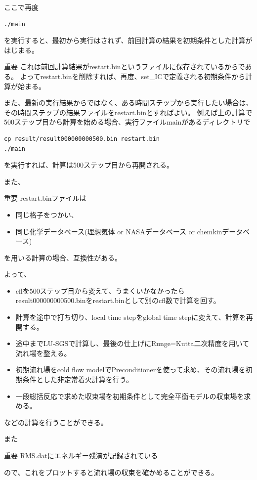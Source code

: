 \documentclass{jsarticle}
\begin{document}
\hspace{1em}

ここで再度
\begin{verbatim}
./main
\end{verbatim}
を実行すると、最初から実行はされず、前回計算の結果を初期条件とした計算がはじまる。
\begin{itembox}[l]{重要}
これは前回計算結果がrestart.binというファイルに保存されているからである。
よってrestart.binを削除すれば、再度、set\_ICで定義される初期条件から計算が始まる。
\end{itembox}
また、最新の実行結果からではなく、ある時間ステップから実行したい場合は、その時間ステップの結果ファイルをrestart.binとすればよい。
例えば上の計算で500ステップ目から計算を始める場合、実行ファイルmainがあるディレクトリで
\begin{verbatim}
cp result/result000000000500.bin restart.bin
./main
\end{verbatim}
を実行すれば、計算は500ステップ目から再開される。

また、
\begin{itembox}[l]{重要}
restart.binファイルは
\begin{itemize}
\item 同じ格子をつかい、
\item 同じ化学データベース(理想気体 or NASAデータベース or chemkinデータベース)
\end{itemize}
を用いる計算の場合、互換性がある。
\end{itembox}
よって、
\begin{itemize}
\item cflを500ステップ目から変えて、うまくいかなかったらresult000000000500.binをrestart.binとして別のcfl数で計算を回す。
\item 計算を途中で打ち切り、local time stepをglobal time stepに変えて、計算を再開する。
\item 途中までLU-SGSで計算し、最後の仕上げにRunge=Kutta二次精度を用いて流れ場を整える。
\item 初期流れ場をcold flow modelでPreconditionerを使って求め、その流れ場を初期条件とした非定常着火計算を行う。
\item 一段総括反応で求めた収束場を初期条件として完全平衡モデルの収束場を求める。
\end{itemize}
などの計算を行うことができる。

\hspace{1em}

また
\begin{itembox}[l]{重要}
RMS.datにエネルギー残渣が記録されている
\end{itembox}
ので、これをプロットすると流れ場の収束を確かめることができる。
\end{document}
